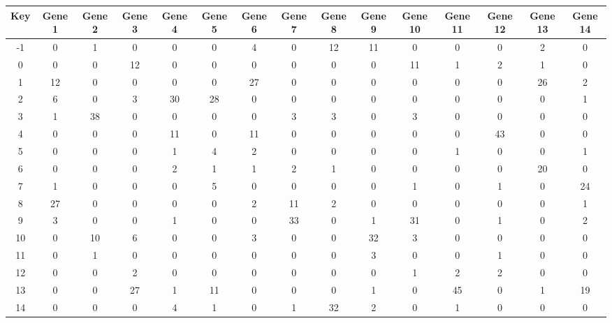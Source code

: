 \begin{tabular}{|c|c|c|c|c|c|c|c|c|c|c|c|c|c|c|}
\hline
Key & Gene 1 & Gene 2 & Gene 3 & Gene 4 & Gene 5 & Gene 6 & Gene 7 & Gene 8 & Gene 9 & Gene 10 & Gene 11 & Gene 12 & Gene 13 & Gene 14 \\
\hline
-1 & 0 & 1 & 0 & 0 & 0 & 4 & 0 & 12 & 11 & 0 & 0 & 0 & 2 & 0 \\
0 & 0 & 0 & 12 & 0 & 0 & 0 & 0 & 0 & 0 & 11 & 1 & 2 & 1 & 0 \\
1 & 12 & 0 & 0 & 0 & 0 & 27 & 0 & 0 & 0 & 0 & 0 & 0 & 26 & 2 \\
2 & 6 & 0 & 3 & 30 & 28 & 0 & 0 & 0 & 0 & 0 & 0 & 0 & 0 & 1 \\
3 & 1 & 38 & 0 & 0 & 0 & 0 & 3 & 3 & 0 & 3 & 0 & 0 & 0 & 0 \\
4 & 0 & 0 & 0 & 11 & 0 & 11 & 0 & 0 & 0 & 0 & 0 & 43 & 0 & 0 \\
5 & 0 & 0 & 0 & 1 & 4 & 2 & 0 & 0 & 0 & 0 & 1 & 0 & 0 & 1 \\
6 & 0 & 0 & 0 & 2 & 1 & 1 & 2 & 1 & 0 & 0 & 0 & 0 & 20 & 0 \\
7 & 1 & 0 & 0 & 0 & 5 & 0 & 0 & 0 & 0 & 1 & 0 & 1 & 0 & 24 \\
8 & 27 & 0 & 0 & 0 & 0 & 2 & 11 & 2 & 0 & 0 & 0 & 0 & 0 & 1 \\
9 & 3 & 0 & 0 & 1 & 0 & 0 & 33 & 0 & 1 & 31 & 0 & 1 & 0 & 2 \\
10 & 0 & 10 & 6 & 0 & 0 & 3 & 0 & 0 & 32 & 3 & 0 & 0 & 0 & 0 \\
11 & 0 & 1 & 0 & 0 & 0 & 0 & 0 & 0 & 3 & 0 & 0 & 1 & 0 & 0 \\
12 & 0 & 0 & 2 & 0 & 0 & 0 & 0 & 0 & 0 & 1 & 2 & 2 & 0 & 0 \\
13 & 0 & 0 & 27 & 1 & 11 & 0 & 0 & 0 & 1 & 0 & 45 & 0 & 1 & 19 \\
14 & 0 & 0 & 0 & 4 & 1 & 0 & 1 & 32 & 2 & 0 & 1 & 0 & 0 & 0 \\
\hline
\end{tabular}